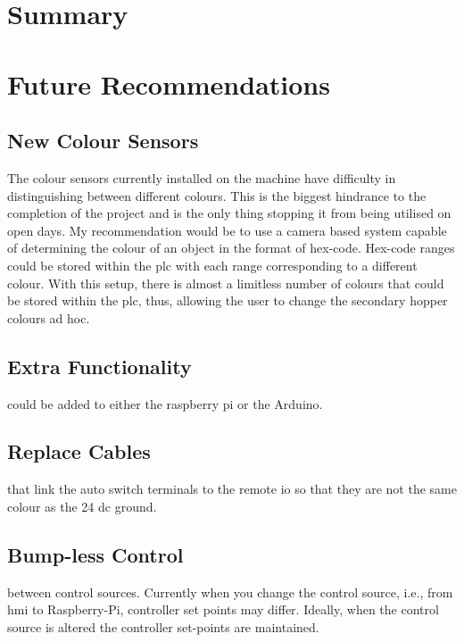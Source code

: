 \section{Summary}

\section{Future Recommendations}


    \subsection{New Colour Sensors} 
        The colour sensors currently installed on the machine have difficulty in distinguishing between different colours. This is the biggest hindrance to the completion of the project and is the only thing stopping it from being utilised on open days. My recommendation would be to use a camera based system capable of determining the colour of an object in the format of hex-code. Hex-code ranges could be stored within the \acrshort{plc} with each range corresponding to a different colour. With this setup, there is almost a limitless number of colours that could be stored within the \acrshort{plc}, thus, allowing the user to change the secondary hopper colours ad hoc.
    
    \subsection{Extra Functionality} 
        could be added to either the raspberry pi or the Arduino.
    
    \subsection{Replace Cables} 
        that link the auto switch terminals to the remote io so that they are not the same colour as the 24 dc ground.
    
    \subsection{Bump-less Control} 
        between control sources. Currently when you change the control source, i.e., from \acrshort{hmi} to Raspberry-Pi, controller set points may differ.  Ideally, when the control source is altered the controller set-points are maintained. 
    
